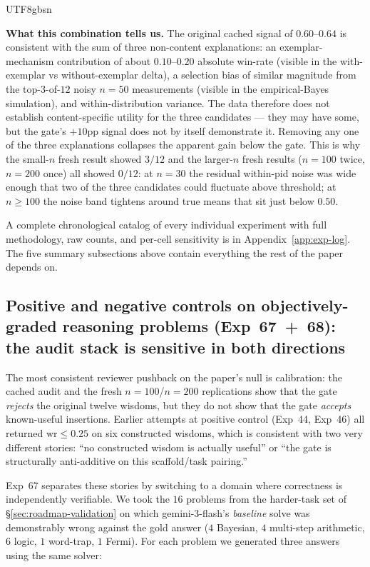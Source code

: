 \documentclass{article}
\begin{document}
\begin{CJK*}{UTF8}{gbsn}
\medskip

\noindent\textbf{What this combination tells us.} The original
cached signal of \(0.60\)--\(0.64\) is consistent with the sum of
three non-content explanations: an exemplar-mechanism
contribution of about \(0.10\)--\(0.20\) absolute win-rate
(visible in the with-exemplar vs without-exemplar delta), a
selection bias of similar magnitude from the
top-\(3\)-of-\(12\) noisy \(n{=}50\) measurements (visible in
the empirical-Bayes simulation), and within-distribution
variance. The data therefore does not establish content-specific
utility for the three candidates --- they may have some, but the
gate's \(+10\)pp signal does not by itself demonstrate it.
Removing any one of the three explanations collapses the apparent
gain below the gate. This is why the small-\(n\) fresh
result showed \(3/12\) and the larger-\(n\) fresh results
(\(n{=}100\) twice, \(n{=}200\) once) all showed \(0/12\): at
\(n=30\) the residual within-pid noise was wide enough that two
of the three candidates could fluctuate above threshold; at
\(n \geq 100\) the noise band tightens around true means that
sit just below \(0.50\).


\medskip

\noindent A complete chronological catalog of every individual
experiment with full methodology, raw counts, and per-cell
sensitivity is in Appendix~\ref{app:exp-log}. The five summary
subsections above contain everything the rest of the paper
depends on.

\subsection{Positive and negative controls on objectively-graded
reasoning problems (Exp~67~+~68): the audit stack is sensitive
in both directions}
\label{sec:exp-summary-poscontrol}

The most consistent reviewer pushback on the paper's null is
calibration: the cached audit and the fresh \(n=100\)/\(n=200\)
replications show that the gate \emph{rejects} the original twelve
wisdoms, but they do not show that the gate \emph{accepts} known-useful
insertions. Earlier attempts at positive control (Exp~44, Exp~46)
all returned \(\mathrm{wr} \leq 0.25\) on six constructed wisdoms,
which is consistent with two very different stories: ``no constructed
wisdom is actually useful'' or ``the gate is structurally
anti-additive on this scaffold/task pairing.''

Exp~67 separates these stories by switching to a domain where
correctness is independently verifiable. We took the
\(16\) problems from the harder-task set of \S\ref{sec:roadmap-validation}
on which gemini-3-flash's \emph{baseline} solve was demonstrably
wrong against the gold answer (\(4\) Bayesian, \(4\) multi-step
arithmetic, \(6\) logic, \(1\) word-trap, \(1\) Fermi). For each
problem we generated three answers using the same solver:


\end{CJK*}
\end{document}
